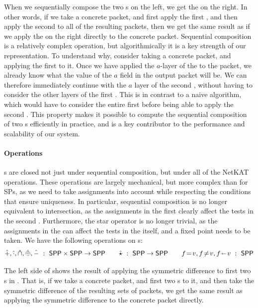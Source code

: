 \documentclass[acmsmall,dvipsnames,nonacm]{acmart}
\begin{document}
When we sequentially compose the two \SPPn{}s on the left, we get the
\SPPn{} on the right.  In other words, if we take a concrete packet,
and first apply the first \SPPn{}, and then apply the second \SPPn{}
to all of the resulting packets, then we get the same result as if we
apply the \SPPn{} on the right directly to the concrete
packet. Sequential composition is a relatively complex operation, but
algorithmically it is a key strength of our representation.  To
understand why, consider taking a concrete packet, and applying the
first \SPPn{} to it.  Once we have applied the $a$-layer of the
\SPPn{} to the packet, we already know what the value of the $a$ field
in the output packet will be.  We can therefore immediately continue
with the $a$ layer of the second \SPPn{}, without having to consider
the other layers of the first \SPPn{}.  This is in contrast to a naive
algorithm, which would have to consider the entire first \SPPn{}
before being able to apply the second \SPPn{}.  This property makes it
possible to compute the sequential composition of two \SPPn{}s
efficiently in practice, and is a key contributor to the performance
and scalability of our system.

\paragraph{Operations}
%
\SPPn{}s are closed not just under sequential composition, but under
all of the NetKAT operations.  These operations are largely
mechanical, but more complex than for SPs, as we need to take
assignments into account while respecting the conditions that ensure
uniqueness.  In particular, sequential composition is no longer
equivalent to intersection, as the assignments in the first \SPPn{}
clearly affect the tests in the second \SPPn{}.  Furthermore, the star
operator is no longer trivial, as the assignments in the \SPPn{} can
affect the tests in the \SPPn{} itself, and a fixed point needs to be
taken. We have the following operations on \SPPn{}s:
\begin{align*}
    \hat{+}, \hat{\cdot}, \hat{\cap}, \hat{\oplus}, \hat{-}\ :\ \mathsf{SPP} \times \mathsf{SPP} \to \mathsf{SPP} \qquad
    \hat{\star}\ :\ \mathsf{SPP} \to \mathsf{SPP} \qquad
    f \mathrel{\!=\!} v, f \mathrel{\!\neq\!} v, f \mathrel{\!\shortleftarrow\!} v \ :\ \mathsf{SPP}
\end{align*}

The left side of  shows the result of applying the
symmetric difference to first two \SPPn{}s in .  That
is, if we take a concrete packet, and first two \SPPn{}s to it, and
then take the symmetric difference of the resulting sets of packets,
we get the same result as applying the symmetric difference \SPPn{} to
the concrete packet directly.
\end{document}

